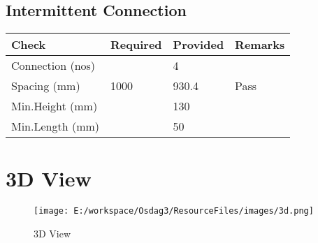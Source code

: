 \documentclass{article}%
\begin{document}
%
\newpage%
\subsection{Intermittent Connection}%
\label{subsec:IntermittentConnection}%
\renewcommand{\arraystretch}{1.2}%
\begin{longtable}{|p{2.5cm}|p{5cm}|p{7.5cm}|p{1cm}|}%
\hline%
\rowcolor{OsdagGreen}%
Check&Required&Provided&Remarks\\%
\hline%
\endhead%
\hline%
Connection (nos)& &4&\\%
\hline%
Spacing (mm)&1000&930.4&Pass\\%
\hline%
Min.Height (mm)&&130&\\%
\hline%
Min.Length (mm)&&50&\\%
\hline%
\end{longtable}

%
%
\newpage%
\section{3D View}%
\label{sec:3DView}%


\begin{figure}[h!]%
\centering%
\texttt{[image: E:/workspace/Osdag3/ResourceFiles/images/3d.png]}%
\caption{3D View}%
\end{figure}

%
\end{document}
